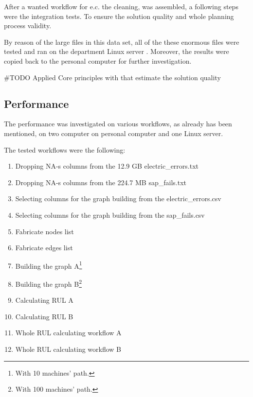 After a wanted workflow for e.c. the cleaning, was assembled, a following steps were the integration tests. To ensure the solution quality and whole planning process validity.

By reason of the large files in this data set, all of the these enormous files were tested and ran on the department Linux server \cite{Batman}.
Moreover, the results were copied back to the personal computer for further investigation.

\#TODO Applied Core principles with that estimate the solution quality
\subsection{Performance}
The performance was investigated on various workflows, as already has been mentioned, on two computer on personal computer\cite{Latitude} and one Linux server\cite{Batman}.

The tested workflows were the following:
\begin{enumerate}
	\item{Dropping NA-s columns from the 12.9 GB electric\_errors.txt}
	\item{Dropping NA-s columns from the 224.7 MB sap\_fails.txt}
	\item{Selecting columns for the graph building from the electric\_errors.csv}
	\item{Selecting columns for the graph building from the sap\_fails.csv}
	\item{Fabricate nodes list}
	\item{Fabricate edges list}
	\item{Building the graph A\footnote{With 10 machines' path.}}
	\item{Building the graph B\footnote{With 100 machines' path.}}
	\item{Calculating RUL A}
	\item{Calculating RUL B}
	\item{Whole RUL calculating workflow A}
	\item{Whole RUL calculating workflow B}
\end{enumerate} 

